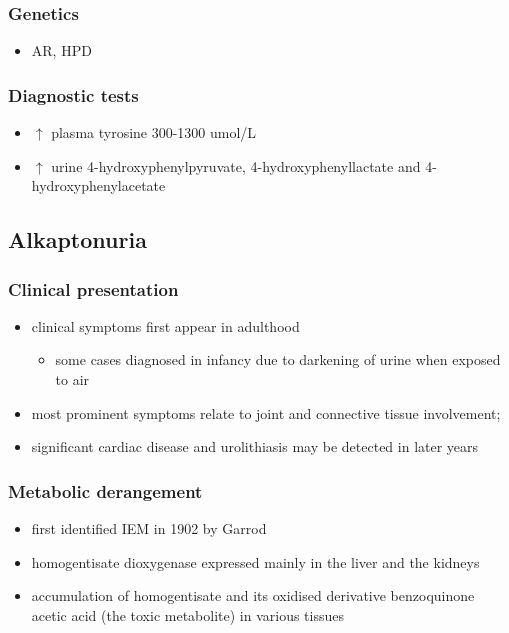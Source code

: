 \documentclass{scrartcl}
\begin{document}
\subsubsection{Genetics}
\label{sec:org971c376}
\begin{itemize}
\item AR, HPD
\end{itemize}
\subsubsection{Diagnostic tests}
\label{sec:orgd65114c}
\begin{itemize}
\item \(\uparrow\) plasma tyrosine 300-1300 umol/L
\item \(\uparrow\) urine 4-hydroxyphenylpyruvate, 4-hydroxyphenyllactate and 4-hydroxyphenylacetate
\end{itemize}


\subsection{Alkaptonuria}
\label{sec:org7fec1ac}
\subsubsection{Clinical presentation}
\label{sec:orge73a307}
\begin{itemize}
\item clinical symptoms first appear in adulthood
\begin{itemize}
\item some cases diagnosed in infancy due to darkening of urine when
exposed to air
\end{itemize}
\item most prominent symptoms relate to joint and connective tissue involvement;
\item significant cardiac disease and urolithiasis may be detected in later years
\end{itemize}
\subsubsection{Metabolic derangement}
\label{sec:org403b342}
\begin{itemize}
\item first identified IEM in 1902 by Garrod
\item homogentisate dioxygenase expressed mainly in the liver and the
kidneys
\end{itemize}
\begin{itemize}
\item accumulation of homogentisate and its oxidised derivative
benzoquinone acetic acid (the toxic metabolite) in various tissues
\end{itemize}
\end{document}
